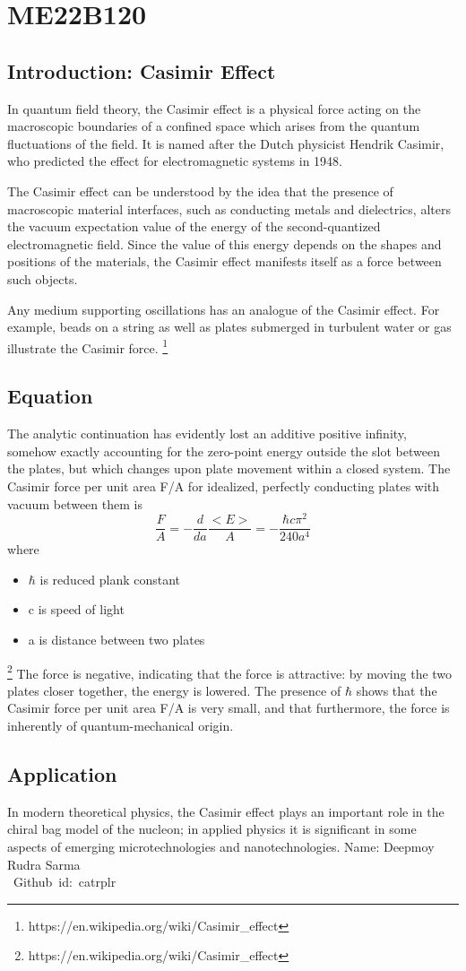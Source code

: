 \section{ME22B120}
\subsection{Introduction: Casimir Effect }
In quantum field theory, the Casimir effect is a physical force acting on the macroscopic boundaries of a confined space which arises from the quantum fluctuations of the field. It is named after the Dutch physicist Hendrik Casimir, who predicted the effect for electromagnetic systems in 1948.

The Casimir effect can be understood by the idea that the presence of macroscopic material interfaces, such as conducting metals and dielectrics, alters the vacuum expectation value of the energy of the second-quantized electromagnetic field. Since the value of this energy depends on the shapes and positions of the materials, the Casimir effect manifests itself as a force between such objects.

Any medium supporting oscillations has an analogue of the Casimir effect. For example, beads on a string as well as plates submerged in turbulent water or gas  illustrate the Casimir force.
\footnote{https://en.wikipedia.org/wiki/Casimir_effect}

\subsection{Equation}
The analytic continuation has evidently lost an additive positive infinity, somehow exactly accounting for the zero-point energy outside the slot between the plates, but which changes upon plate movement within a closed system. The Casimir force per unit area F/A for idealized, perfectly conducting plates with vacuum between them is
\begin{equation}
\frac{F}{A}=-\frac{d}{da}\frac{<E>}{A}=-\frac{\hbar c\pi^2}{240a^4}
\end{equation}
where 
\begin{itemize}
    \item $\hbar$ is reduced plank constant
    \item c is speed of light
    \item a is distance between two plates
    
\end{itemize}
\footnote{https://en.wikipedia.org/wiki/Casimir_effect}
The force is negative, indicating that the force is attractive: by moving the two plates closer together, the energy is lowered. The presence of $\hbar$ shows that the Casimir force per unit area F/A
 is very small, and that furthermore, the force is inherently of quantum-mechanical origin.
\subsection{Application}
In modern theoretical physics, the Casimir effect plays an important role in the chiral bag model of the nucleon; in applied physics it is significant in some aspects of emerging microtechnologies and nanotechnologies.
 Name: Deepmoy Rudra Sarma \\
\ Github id: catrplr